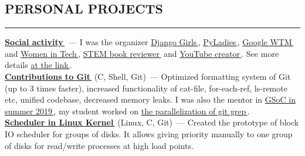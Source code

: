 \documentclass[11pt]{res} %
\let\orighref\href
\renewcommand{\href}[2]{\orighref{#1}{#2\,\faExternalLink}}
\begin{document}
\begin{resume}
        \section{\uppercase{Personal Projects}}
        \begin{spacing}{0.3}
            \textcolor[RGB]{220,220,220}{\rule{\linewidth}{0.4pt}}
        \end{spacing}
        \textbf{\href{https://github.com/telezhnaya/about/blob/master/My_social_impact.md}{Social activity}}~--- I was the organizer \href{https://djangogirls.org/stpetersburg/}{Django Girls}, \href{https://spb.pyladies.com/}{PyLadies}, \href{https://www.womentechmakers.com}{Google WTM} and \href{https://women-in-tech.org}{Women in Tech}, \href{https://dmkpress.com/catalog/computer/}{STEM book reviewer} and \href{https://www.youtube.com/programming_together/}{YouTube creator}. See more details \href{https://github.com/telezhnaya/about/blob/master/My_social_impact.md}{at the link}.\\
        \textbf{\href{https://github.com/git/git/commits?author=telezhnaya}{Contributions to Git}} (C, Shell, Git)~--- Optimized formatting system of Git (up to 3 times faster), increased functionality of cat-file, for-each-ref, ls-remote etc, unified codebase, decreased memory leaks. I was also the mentor in \href{https://summerofcode.withgoogle.com/}{GSoC in summer 2019}, my student worked on \href{https://summerofcode.withgoogle.com/projects/\#6477677521797120}{the parallelization of git grep}.\\
        \textbf{\href{https://github.com/telezhnaya/linux}{Scheduler in Linux Kernel}} (Linux, C, Git)~--- Created the prototype of block IO scheduler for groups of disks. It allows giving priority manually to one group of disks for read/write processes at high load points.\\




\end{resume}
\end{document}
